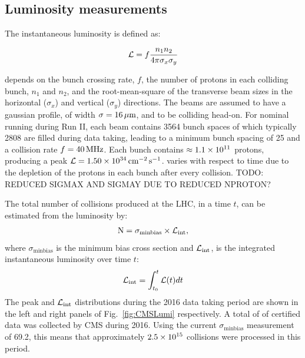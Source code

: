 \subsection{Luminosity measurements}
\label{ssec:lumi}

The instantaneous luminosity is defined as:

\begin{equation}
\label{eq:InsLumi}
\mathcal{L} = f \frac{n_{1}n_{2}}{4\pi \sigma_{x} \sigma_{y}}
\end{equation}

\Lum{} depends on the bunch crossing rate, $f$, the number of protons in each colliding bunch, $n_{1}$ and $n_{2}$, and the root-mean-square of the transverse beam sizes in the horizontal ($\sigma_{x}$) and vertical ($\sigma_{y}$) directions. 
The beams are assumed to have a gaussian profile, of width $\sigma=16\,\mu\text{m}$, and to be colliding head-on.
For nominal running during Run II, each beam contains 3564 bunch spaces of which typically 2808 are filled during data taking, leading to a minimum bunch spacing of 25\ns{} and a collision rate $f=40\,\text{MHz}$.
Each bunch contains $\approx 1.1\times \text{10}^\text{11}$ protons, producing a peak $\mathcal{L}=1.50\times \text{10}^\text{34}\,\text{cm}^\text{$-$2}\,\text{s}^\text{$-$1}$.
\Lum{} varies with respect to time due to the depletion of the protons in each bunch after every collision.
TODO: REDUCED SIGMAX AND SIGMAY DUE TO REDUCED NPROTON?

The total number of collisions produced at the LHC, in a time $t$, can be estimated from the luminosity by:
\begin{equation}
\label{eq:nEvent}
\text{N} = \sigma_{\text{minbias}} \times \mathcal{L}_{\text{int}}, 
\end{equation}
where $\sigma_{\text{minbias}}$ is the minimum bias cross section and $\mathcal{L}_{\text{int}}$, is the integrated instantaneous luminosity over time $t$:
\begin{equation}
\label{eq:IntLumi}
\mathcal{L}_{\text{int}} = \int^{t}_{t_{0}}\mathcal{L}(t) dt
\end{equation}
The peak \Lum{} and $\mathcal{L}_{\text{int}}$ distributions during the 2016 data taking period are shown in the left and right panels of Fig.~\ref{fig:CMSLumi} respectively.
A total of \Lumi{} of certified data was collected by CMS during 2016.
Using the current $\sigma_{\text{minbias}}$ measurement of 69.2\mb{}, this means that approximately $2.5\times \text{10}^\text{15}$ collisions were processed in this period.

